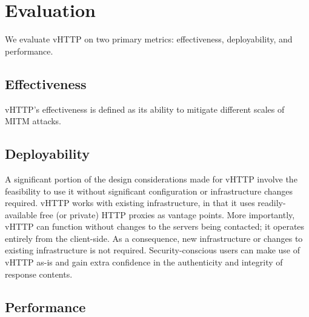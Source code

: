 \section{Evaluation}
\label{sec:eval}

We evaluate vHTTP on two primary metrics: effectiveness, deployability, and
performance.


\subsection{Effectiveness}

vHTTP's effectiveness is defined as its ability to mitigate different scales of
MITM attacks.

\subsection{Deployability}

A significant portion of the design considerations made for vHTTP involve the
feasibility to use it without significant configuration or infrastructure
changes required. vHTTP works with existing infrastructure, in that it uses
readily-available free (or private) HTTP proxies as vantage points. More
importantly, vHTTP can function without changes to the servers being contacted;
it operates entirely from the client-side. As a consequence, new infrastructure
or changes to existing infrastructure is not required. Security-conscious users
can make use of vHTTP as-is and gain extra confidence in the authenticity and
integrity of response contents.

\subsection{Performance}
